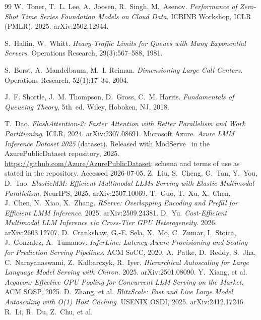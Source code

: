 \begin{thebibliography}{99}
W.~Toner, T.~L. Lee, A.~Joosen, R.~Singh, M.~Asenov.
\emph{Performance of Zero-Shot Time Series Foundation Models on Cloud Data}.
ICBINB Workshop, ICLR (PMLR), 2025. arXiv:2502.12944.

S.~Halfin, W.~Whitt.
\emph{Heavy-Traffic Limits for Queues with Many Exponential Servers}.
Operations Research, 29(3):567--588, 1981.

S.~Borst, A.~Mandelbaum, M.~I. Reiman.
\emph{Dimensioning Large Call Centers}.
Operations Research, 52(1):17--34, 2004.

J.~F. Shortle, J.~M. Thompson, D.~Gross, C.~M. Harris.
\emph{Fundamentals of Queueing Theory}, 5th~ed.
Wiley, Hoboken, NJ, 2018.

T.~Dao.
\emph{FlashAttention-2: Faster Attention with Better Parallelism and Work
Partitioning}.
ICLR, 2024. arXiv:2307.08691.
Microsoft Azure.
\emph{Azure LMM Inference Dataset 2025} (dataset). Released with
ModServe~\cite{Qiu2025ModServe} in the AzurePublicDataset repository,
2025. \url{https://github.com/Azure/AzurePublicDataset}; schema and
terms of use as stated in the repository. Accessed 2026-07-05.
Z.~Liu, S.~Cheng, G.~Tan, Y.~You, D.~Tao.
\emph{ElasticMM: Efficient Multimodal LLMs Serving with Elastic
Multimodal Parallelism}.
NeurIPS, 2025. arXiv:2507.10069.
T.~Guo, T.~Xu, X.~Chen, J.~Chen, N.~Xiao, X.~Zhang.
\emph{RServe: Overlapping Encoding and Prefill for Efficient LMM
Inference}.
2025. arXiv:2509.24381.
D.~Yu.
\emph{Cost-Efficient Multimodal LLM Inference via Cross-Tier GPU
Heterogeneity}.
2026. arXiv:2603.12707.
D.~Crankshaw, G.-E. Sela, X.~Mo, C.~Zumar, I.~Stoica, J.~Gonzalez,
A.~Tumanov.
\emph{InferLine: Latency-Aware Provisioning and Scaling for Prediction
Serving Pipelines}.
ACM SoCC, 2020.
A.~Patke, D.~Reddy, S.~Jha, C.~Narayanaswami, Z.~Kalbarczyk, R.~Iyer.
\emph{Hierarchical Autoscaling for Large Language Model Serving with
Chiron}.
2025. arXiv:2501.08090.
Y.~Xiang, et al.
\emph{Aegaeon: Effective GPU Pooling for Concurrent LLM Serving on the
Market}.
ACM SOSP, 2025.
D.~Zhang, et al.
\emph{BlitzScale: Fast and Live Large Model Autoscaling with O(1) Host
Caching}.
USENIX OSDI, 2025. arXiv:2412.17246.
R.~Li, R.~Du, Z.~Chu, et al.

\end{thebibliography}
